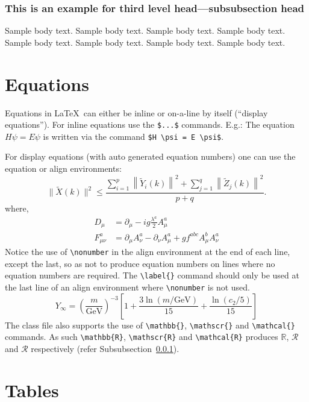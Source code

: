\documentclass[sn-standardnature]{sn-jnl}%
\theoremstyle{thmstyleone}%
\theoremstyle{thmstyletwo}%
\theoremstyle{thmstylethree}%
\begin{document}
\subsubsection{This is an example for third level head---subsubsection head}\label{subsubsec2}

Sample body text. Sample body text. Sample body text. Sample body text. Sample body text. Sample body text. Sample body text. Sample body text. 

\section{Equations}\label{sec4}

Equations in \LaTeX\ can either be inline or on-a-line by itself (``display equations''). For
inline equations use the \verb+$...$+ commands. E.g.: The equation
$H\psi = E \psi$ is written via the command \verb+$H \psi = E \psi$+.

For display equations (with auto generated equation numbers)
one can use the equation or align environments:
\begin{equation}
\|\tilde{X}(k)\|^2 \leq\frac{\sum\limits_{i=1}^{p}\left\|\tilde{Y}_i(k)\right\|^2+\sum\limits_{j=1}^{q}\left\|\tilde{Z}_j(k)\right\|^2 }{p+q}.\label{eq1}
\end{equation}
where,
\begin{align}
D_\mu &=  \partial_\mu - ig \frac{\lambda^a}{2} A^a_\mu \nonumber \\
F^a_{\mu\nu} &= \partial_\mu A^a_\nu - \partial_\nu A^a_\mu + g f^{abc} A^b_\mu A^a_\nu \label{eq2}
\end{align}
Notice the use of \verb+\nonumber+ in the align environment at the end
of each line, except the last, so as not to produce equation numbers on
lines where no equation numbers are required. The \verb+\label{}+ command
should only be used at the last line of an align environment where
\verb+\nonumber+ is not used.
\begin{equation}
Y_\infty = \left( \frac{m}{\textrm{GeV}} \right)^{-3}
    \left[ 1 + \frac{3 \ln(m/\textrm{GeV})}{15}
    + \frac{\ln(c_2/5)}{15} \right]
\end{equation}
The class file also supports the use of \verb+\mathbb{}+, \verb+\mathscr{}+ and
\verb+\mathcal{}+ commands. As such \verb+\mathbb{R}+, \verb+\mathscr{R}+
and \verb+\mathcal{R}+ produces $\mathbb{R}$, $\mathscr{R}$ and $\mathcal{R}$
respectively (refer Subsubsection~\ref{subsubsec2}).

\section{Tables}\label{sec5}
\end{document}
